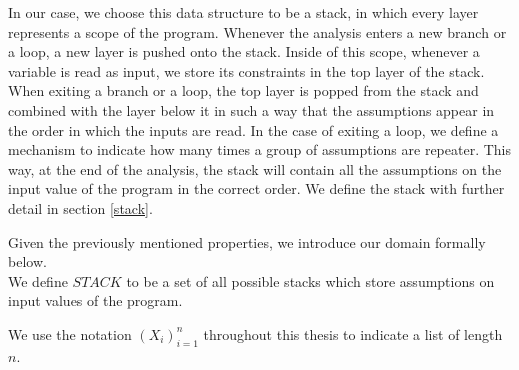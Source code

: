 \documentclass[10pt]{report}
\begin{document}
In our case, we choose this data structure to be a stack, in which every layer represents a scope of the program. Whenever the analysis enters a new branch or a loop, a new layer is pushed onto the stack. Inside of this scope, whenever a variable is read as input, we store its constraints in the top layer of the stack. When exiting a branch or a loop, the top layer is popped from the stack and combined with the layer below it in such a way that the assumptions appear in the order in which the inputs are read. In the case of exiting a loop, we define a mechanism to indicate how many times a group of assumptions are repeater. This way, at the end of the analysis, the stack will contain all the assumptions on the input value of the program in the correct order. We define the stack with further detail in section \ref{stack}. 

Given the previously mentioned properties, we introduce our domain formally below. \\
  

We define $STACK$ to be a set of all possible stacks which store assumptions on input values of the program.

We use the notation $ (X_{i})_{i=1}^{n} $ throughout this thesis to indicate a list of length $ n $.  \\
\end{document}
